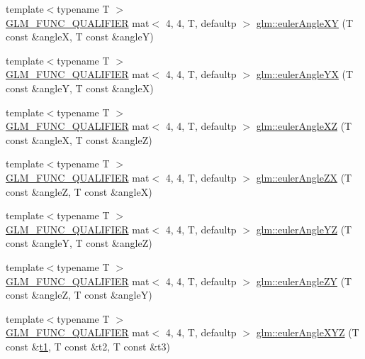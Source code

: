 \begin{DoxyCompactItemize}
\item 
{\footnotesize template$<$typename T $>$ }\\\hyperlink{setup_8hpp_a33fdea6f91c5f834105f7415e2a64407}{G\+L\+M\+\_\+\+F\+U\+N\+C\+\_\+\+Q\+U\+A\+L\+I\+F\+I\+ER} mat$<$ 4, 4, T, defaultp $>$ \hyperlink{group__gtx__euler__angles_ga64036577ee17a2d24be0dbc05881d4e2}{glm\+::euler\+Angle\+XY} (T const \&angleX, T const \&angleY)
\item 
{\footnotesize template$<$typename T $>$ }\\\hyperlink{setup_8hpp_a33fdea6f91c5f834105f7415e2a64407}{G\+L\+M\+\_\+\+F\+U\+N\+C\+\_\+\+Q\+U\+A\+L\+I\+F\+I\+ER} mat$<$ 4, 4, T, defaultp $>$ \hyperlink{group__gtx__euler__angles_ga4f57e6dd25c3cffbbd4daa6ef3f4486d}{glm\+::euler\+Angle\+YX} (T const \&angleY, T const \&angleX)
\item 
{\footnotesize template$<$typename T $>$ }\\\hyperlink{setup_8hpp_a33fdea6f91c5f834105f7415e2a64407}{G\+L\+M\+\_\+\+F\+U\+N\+C\+\_\+\+Q\+U\+A\+L\+I\+F\+I\+ER} mat$<$ 4, 4, T, defaultp $>$ \hyperlink{group__gtx__euler__angles_gaa39bd323c65c2fc0a1508be33a237ce9}{glm\+::euler\+Angle\+XZ} (T const \&angleX, T const \&angleZ)
\item 
{\footnotesize template$<$typename T $>$ }\\\hyperlink{setup_8hpp_a33fdea6f91c5f834105f7415e2a64407}{G\+L\+M\+\_\+\+F\+U\+N\+C\+\_\+\+Q\+U\+A\+L\+I\+F\+I\+ER} mat$<$ 4, 4, T, defaultp $>$ \hyperlink{group__gtx__euler__angles_ga483903115cd4059228961046a28d69b5}{glm\+::euler\+Angle\+ZX} (T const \&angleZ, T const \&angleX)
\item 
{\footnotesize template$<$typename T $>$ }\\\hyperlink{setup_8hpp_a33fdea6f91c5f834105f7415e2a64407}{G\+L\+M\+\_\+\+F\+U\+N\+C\+\_\+\+Q\+U\+A\+L\+I\+F\+I\+ER} mat$<$ 4, 4, T, defaultp $>$ \hyperlink{group__gtx__euler__angles_ga220379e10ac8cca55e275f0c9018fed9}{glm\+::euler\+Angle\+YZ} (T const \&angleY, T const \&angleZ)
\item 
{\footnotesize template$<$typename T $>$ }\\\hyperlink{setup_8hpp_a33fdea6f91c5f834105f7415e2a64407}{G\+L\+M\+\_\+\+F\+U\+N\+C\+\_\+\+Q\+U\+A\+L\+I\+F\+I\+ER} mat$<$ 4, 4, T, defaultp $>$ \hyperlink{group__gtx__euler__angles_ga400b2bd5984999efab663f3a68e1d020}{glm\+::euler\+Angle\+ZY} (T const \&angleZ, T const \&angleY)
\item 
{\footnotesize template$<$typename T $>$ }\\\hyperlink{setup_8hpp_a33fdea6f91c5f834105f7415e2a64407}{G\+L\+M\+\_\+\+F\+U\+N\+C\+\_\+\+Q\+U\+A\+L\+I\+F\+I\+ER} mat$<$ 4, 4, T, defaultp $>$ \hyperlink{group__gtx__euler__angles_ga1975e0f0e9bed7f716dc9946da2ab645}{glm\+::euler\+Angle\+X\+YZ} (T const \&\hyperlink{_s_d_l__opengl__glext_8h_af48031a37b713afa3b0d0d7d29653d7c}{t1}, T const \&t2, T const \&t3)

\end{DoxyCompactItemize}
